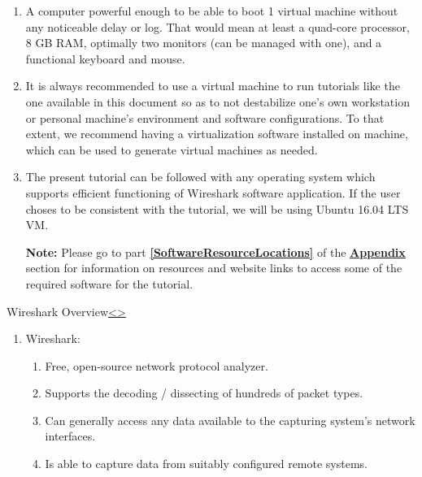 \documentclass[12pt]{extarticle}
\newenvironment{instructionblock}{\Large\bgroup}{\egroup}
\newcommand{\ben}{\begin{enumerate}}
\newcommand{\een}{\end{enumerate}}
\begin{document}
\ben

\item A computer powerful enough to be able to boot 1 virtual machine without any noticeable delay or log. That would mean at least a quad-core processor, 8 GB RAM, optimally two monitors (can be managed with one), and a functional keyboard and mouse.

\item It is always recommended to use a virtual machine to run tutorials like the one available in this document so as to not destabilize one's own workstation or personal machine's environment and software configurations. To that extent, we recommend having a virtualization software installed on machine, which can be used to generate virtual machines as needed. 

\item The present tutorial can be followed with any operating system which supports efficient functioning of Wireshark software application. If the user choses to be consistent with the tutorial, we will be using Ubuntu 16.04 LTS VM.  

\textbf{Note:} Please go to part \textbf{\underline{\ref{SoftwareResourceLocations}}} of the {\textbf{\hyperref[slide 27]{\underline{Appendix}}}} section for information on resources and website links to access some of the required software for the tutorial.

\een


\pagebreak
\begin{slide}{Wireshark Overview}{\hyperref[slide 3]{\textless}\hyperref[slide 5]{\textgreater}}
	\begin{instructionblock}
		\begin{enumerate}
			\item Wireshark:
			\ben
				\item Free, open-source network protocol analyzer.
				\item Supports the decoding / dissecting of hundreds of packet types.
				\item Can generally access any data available to the capturing system's network interfaces.
				\item Is able to capture data from suitably configured remote systems.
			\een
		\end{enumerate}
	\end{instructionblock}
\end{slide}
\vfill
\end{document}
